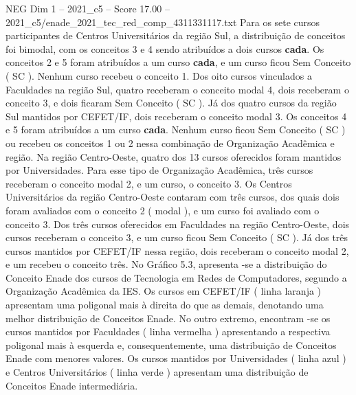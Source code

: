 \begin{textsample}{NEG Dim 1 – 2021\_c5 – Score 17.00 – 2021\_c5/enade\_2021\_tec\_red\_comp\_4311331117.txt}
Para os sete cursos participantes de Centros Universitários da região Sul, a distribuição de conceitos foi bimodal, com os conceitos 3 e 4 sendo atribuídos a dois cursos \textbf{cada}.
Os conceitos 2 e 5 foram atribuídos a um curso \textbf{cada}, e um curso ficou Sem Conceito ( SC ).
Nenhum curso recebeu o conceito 1.
Dos oito cursos vinculados a Faculdades na região Sul, quatro receberam o conceito modal 4, dois receberam o conceito 3, e dois ficaram Sem Conceito ( SC ).
Já dos quatro cursos da região Sul mantidos por CEFET/IF, dois receberam o conceito modal 3.
Os conceitos 4 e 5 foram atribuídos a um curso \textbf{cada}.
Nenhum curso ficou Sem Conceito ( SC ) ou recebeu os conceitos 1 ou 2 nessa combinação de Organização Acadêmica e região.
Na região Centro-Oeste, quatro dos 13 cursos oferecidos foram mantidos por Universidades.
Para esse tipo de Organização Acadêmica, três cursos receberam o conceito modal 2, e um curso, o conceito 3.
Os Centros Universitários da região Centro-Oeste contaram com três cursos, dos quais dois foram avaliados com o conceito 2 ( modal ), e um curso foi avaliado com o conceito 3.
Dos três cursos oferecidos em Faculdades na região Centro-Oeste, dois cursos receberam o conceito 3, e um curso ficou Sem Conceito ( SC ).
Já dos três cursos mantidos por CEFET/IF nessa região, dois receberam o conceito modal 2, e um recebeu o conceito três.
No Gráfico 5.3, apresenta -se a distribuição do Conceito Enade dos cursos de Tecnologia em Redes de Computadores, segundo a Organização Acadêmica da IES.
Os cursos em CEFET/IF ( linha laranja ) apresentam uma poligonal mais à direita do que as demais, denotando uma melhor distribuição de Conceitos Enade.
No outro extremo, encontram -se os cursos mantidos por Faculdades ( linha vermelha ) apresentando a respectiva poligonal mais à esquerda e, consequentemente, uma distribuição de Conceitos Enade com menores valores.
Os cursos mantidos por Universidades ( linha azul ) e Centros Universitários ( linha verde ) apresentam uma distribuição de Conceitos Enade intermediária.

\end{textsample}
